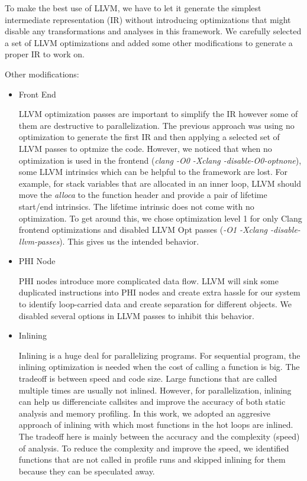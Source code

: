 To make the best use of LLVM, we have to let it generate the simplest
intermediate representation (IR) without introducing optimizations that might
disable any transformations and analyses in this framework. We carefully
selected a set of LLVM optimizations and added some other modifications to
generate a proper IR to work on.

Other modifications:

\begin{itemize}
\item Front End

LLVM optimization passes are important to simplify the IR however some of
them are destructive to parallelization. The previous approach was using no
optimization to generate the first IR and then applying a selected set of
LLVM passes to optmize the code. However, we noticed that when no
optimization is used in the frontend (\textit{clang -O0 -Xclang
-disable-O0-optnone}), some LLVM intrinsics which can be helpful to the
framework are lost. For example, for stack variables that are allocated in
an inner loop, LLVM should move the \textit{alloca} to the function header
and provide a pair of lifetime start/end intrinsics. The lifetime intrinsic
does not come with no optimization. To get around this, we chose
optimization level 1 for only Clang frontend optimizations and disabled LLVM
Opt passes (\textit{-O1 -Xclang -disable-llvm-passes}). This gives us the
intended behavior.


\item PHI Node

PHI nodes introduce more complicated data flow. LLVM will sink some
duplicated instructions into PHI nodes and create extra hassle for our
system to identify loop-carried data and create separation for different
objects. We disabled several options in LLVM passes to inhibit this
behavior.

\item Inlining

Inlining is a huge deal for parallelizing programs. For sequential program,
the inlining optimization is needed when the cost of calling a function is
big. The tradeoff is between speed and code size. Large functions that are
called multiple times are usually not inlined. However, for parallelization,
inlining can help us differenciate callsites and improve the accuracy of
both static analysis and memory profiling. In this work, we adopted an
aggresive approach of inlining with which most functions in the hot loops
are inlined. The tradeoff here is mainly between the accuracy and the
complexity (speed) of analysis. To reduce the complexity and improve the
speed, we identified functions that are not called in profile runs and
skipped inlining for them because they can be speculated away.

\end{itemize}

